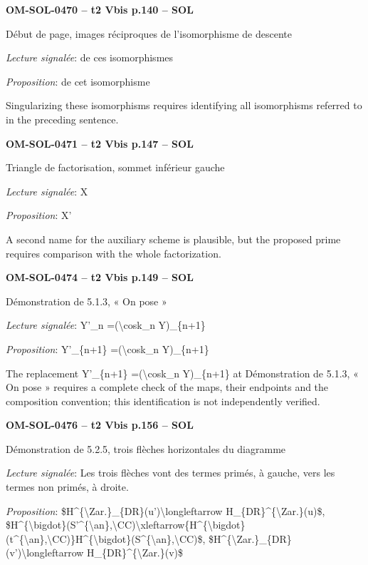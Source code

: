 \par\noindent\textbf{OM-SOL-0470 -- t2 Vbis p.140 -- SOL}\par
Début de page, images réciproques de l'isomorphisme de descente\par
\emph{Lecture signalée}: de ces isomorphismes\par
\emph{Proposition}: de cet isomorphisme\par
Singularizing these isomorphisms requires identifying all isomorphisms referred to in the preceding sentence.\par
\par\noindent\textbf{OM-SOL-0471 -- t2 Vbis p.147 -- SOL}\par
Triangle de factorisation, sommet inférieur gauche\par
\emph{Lecture signalée}: X\par
\emph{Proposition}: X'\par
A second name for the auxiliary scheme is plausible, but the proposed prime requires comparison with the whole factorization.\par
\par\noindent\textbf{OM-SOL-0474 -- t2 Vbis p.149 -- SOL}\par
Démonstration de 5.1.3, « On pose »\par
\emph{Lecture signalée}: Y'\_n =\allowbreak  (\textbackslash{}cosk\_n Y)\_\{n+1\}\par
\emph{Proposition}: Y'\_\{n+1\} =\allowbreak  (\textbackslash{}cosk\_n Y)\_\{n+1\}\par
The replacement Y'\_\{n+1\} =\allowbreak  (\textbackslash{}cosk\_n Y)\_\{n+1\} at Démonstration de 5.1.3, « On pose » requires a complete check of the maps, their endpoints and the composition convention; this identification is not independently verified.\par
\par\noindent\textbf{OM-SOL-0476 -- t2 Vbis p.156 -- SOL}\par
Démonstration de 5.2.5, trois flèches horizontales du diagramme\par
\emph{Lecture signalée}: Les trois flèches vont des termes primés, à gauche, vers les termes non primés, à droite.\par
\emph{Proposition}: \$H\textasciicircum{}\{\textbackslash{}Zar.\}\_\{DR\}(u')\textbackslash{}longleftarrow H\_\{DR\}\textasciicircum{}\{\textbackslash{}Zar.\}(u)\$, \$H\textasciicircum{}\{\textbackslash{}bigdot\}(S'\textasciicircum{}\{\textbackslash{}an\},\textbackslash{}CC)\textbackslash{}xleftarrow\{H\textasciicircum{}\{\textbackslash{}bigdot\}(t\textasciicircum{}\{\textbackslash{}an\},\textbackslash{}CC)\}H\textasciicircum{}\{\textbackslash{}bigdot\}(S\textasciicircum{}\{\textbackslash{}an\},\textbackslash{}CC)\$, \$H\textasciicircum{}\{\textbackslash{}Zar.\}\_\{DR\}(v')\textbackslash{}longleftarrow H\_\{DR\}\textasciicircum{}\{\textbackslash{}Zar.\}(v)\$\par
